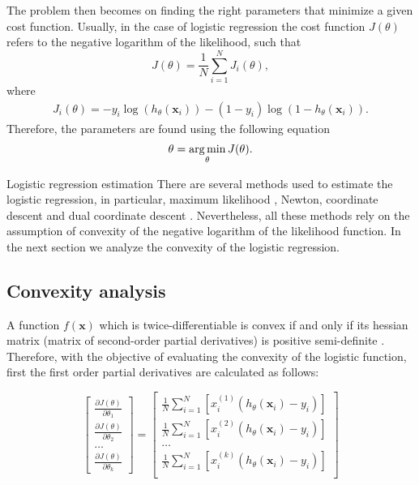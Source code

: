 The problem then becomes on finding the right parameters that minimize a given cost function.   
Usually, in the case of logistic regression the cost function $J(\theta)$ refers to the negative   
logarithm of the likelihood, such that
\begin{equation}
  J(\theta)=\frac{1}{N}\sum_{i=1}^{N} J_i(\theta),
\end{equation}
where
\begin{align}\label{eq:6:lrcost}
  J_i(\theta) =  -y_i\log(h_\theta(\mathbf{x}_i)) -(1-y_i)\log(1-h_\theta(\mathbf{x}_i)).
\end{align}
Therefore, the parameters are found using the following equation
\begin{align}
  \theta = \operatorname*{arg\,min}_\theta J(\theta).
\end{align}

\begin{remark}{Logistic regression estimation}
There are several methods used to estimate the logistic regression, in particular, maximum 
likelihood \citep{Hastie2009}, Newton, coordinate descent \citep{Murphy2012} and dual coordinate 
descent \citep{Yu2011}. Nevertheless, all these methods rely on the assumption of convexity of the
negative logarithm of the likelihood function. In the next section we analyze the convexity of the 
logistic regression.
\end{remark}

\subsection{Convexity analysis}

A function $f(\mathbf{x})$ which is twice-differentiable is convex if and only if its hessian 
matrix (matrix of second-order partial derivatives) is positive semi-definite \citep{Boyd2010}.
Therefore, with the objective of evaluating the convexity of the logistic function, first the first 
order partial derivatives are calculated as follows:

\begin{equation}
\left[ \begin{array}{c}
  \frac{\partial J(\theta)}{\partial \theta_1} \\[0.1in]	
  \frac{\partial J(\theta)}{\partial \theta_2} \\[0.1in]	
  \ldots \\[0.1in]	
  \frac{\partial J(\theta)}{\partial \theta_k}
\end{array} \right] =
\left[ \begin{array}{c}
  \frac{1}{N}\sum_{i=1}^{N}\left[x_i^{(1)}\left(h_\theta(\mathbf{x}_i)-y_i\right)\right]\\[0.1in]
  \frac{1}{N}\sum_{i=1}^{N}\left[x_i^{(2)}\left(h_\theta(\mathbf{x}_i)-y_i\right)\right]\\[0.1in]
  \ldots \\[0.1in]	
  \frac{1}{N}\sum_{i=1}^{N}\left[x_i^{(k)}\left(h_\theta(\mathbf{x}_i)-y_i\right)\right]\\[0.1in]	
\end{array} \right]
\end{equation}

